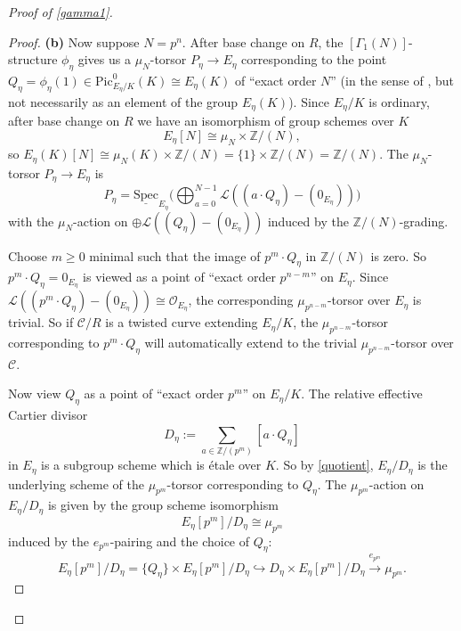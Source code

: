 \documentclass[11pt]{amsart}
\theoremstyle{definition}
\begin{document}
\begin{proof}[Proof of \ref{gamma1}]
\begin{proof}
\textbf{(b)} Now suppose $N = p^n$. After base change on $R$, the $[\Gamma_1(N)]$-structure $\phi_\eta$ gives us a $\mu_N$-torsor $P_\eta \rightarrow E_\eta$ corresponding to the point $Q_\eta = \phi_\eta(1) \in \mathrm{Pic}^0_{E_\eta/K}(K) \cong E_\eta(K)$ of ``exact order $N$'' (in the sense of \cite[\S1.4]{KM1}, but not necessarily as an element of the group $E_\eta(K)$). Since $E_\eta/K$ is ordinary, after base change on $R$ we have an isomorphism of group schemes over $K$ 
\begin{displaymath}
E_\eta[N] \cong \mu_N \times \mathbb{Z}/(N),
\end{displaymath}
so $E_\eta(K)[N] \cong \mu_N(K) \times \mathbb{Z}/(N) = \{1\} \times \mathbb{Z}/(N) = \mathbb{Z}/(N)$. The $\mu_N$-torsor $P_\eta \rightarrow E_\eta$ is 
\begin{displaymath}
P_\eta = \underline{\mathrm{Spec}}_{E_\eta} \big( \bigoplus_{a=0}^{N-1} {\mathcal{L}}((a\cdot Q_\eta) - (0_{E_\eta}))\big)
\end{displaymath}
with the $\mu_N$-action on $\oplus {\mathcal{L}}((Q_\eta) - (0_{E_\eta}))$ induced by the $\mathbb{Z}/(N)$-grading.

Choose $m\geq 0$ minimal such that the image of $p^m \cdot Q_\eta$ in $\mathbb{Z}/(N)$ is zero. So $p^m \cdot Q_\eta = 0_{E_\eta}$ is viewed as a point of ``exact order $p^{n-m}$'' on $E_\eta$. Since ${\mathcal{L}}((p^m \cdot Q_\eta) - (0_{E_\eta})) \cong {\mathcal{O}}_{E_\eta}$, the corresponding $\mu_{p^{n-m}}$-torsor over $E_\eta$ is trivial. So if ${\mathcal{C}}/R$ is a twisted curve extending $E_\eta/K$, the $\mu_{p^{n-m}}$-torsor corresponding to $p^m \cdot Q_\eta$ will automatically extend to the trivial $\mu_{p^{n-m}}$-torsor over ${\mathcal{C}}$.

Now view $Q_\eta$ as a point of ``exact order $p^m$'' on $E_\eta/K$. The relative effective Cartier divisor 
\begin{displaymath}
D_\eta := \sum_{a \in \mathbb{Z}/(p^m)} [a\cdot Q_\eta] 
\end{displaymath}
in $E_\eta$ is a subgroup scheme which is \'etale over $K$. So by \ref{quotient}, $E_\eta/D_\eta$ is the underlying scheme of the $\mu_{p^m}$-torsor corresponding to $Q_\eta$. The $\mu_{p^m}$-action on $E_\eta/D_\eta$ is given by the group scheme isomorphism 
\begin{displaymath}
E_\eta[p^m]/D_\eta \cong \mu_{p^m}
\end{displaymath}
induced by the $e_{p^m}$-pairing and the choice of $Q_\eta$:
\begin{displaymath}
E_\eta[p^m]/D_\eta = \{Q_\eta\} \times E_\eta[p^m]/D_\eta \hookrightarrow D_\eta \times E_\eta[p^m]/D_\eta \stackrel{e_{p^m}}{\rightarrow} \mu_{p^m}.
\end{displaymath}


\end{proof}
\end{proof}
\end{document}
